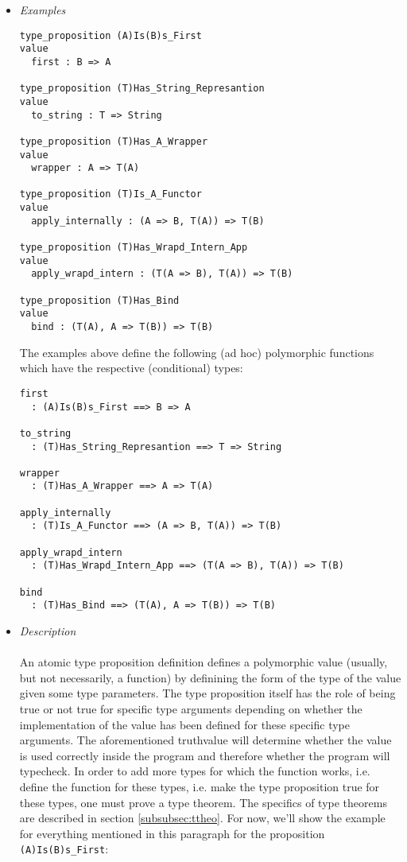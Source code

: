 \documentclass{article}
\begin{document}
\begin{itemize}
\item \textit{Examples}
\begin{verbatim}
type_proposition (A)Is(B)s_First
value
  first : B => A

type_proposition (T)Has_String_Represantion
value
  to_string : T => String

type_proposition (T)Has_A_Wrapper
value
  wrapper : A => T(A)

type_proposition (T)Is_A_Functor
value
  apply_internally : (A => B, T(A)) => T(B)

type_proposition (T)Has_Wrapd_Intern_App
value
  apply_wrapd_intern : (T(A => B), T(A)) => T(B)

type_proposition (T)Has_Bind
value
  bind : (T(A), A => T(B)) => T(B)
\end{verbatim}
The examples above define the following (ad hoc) polymorphic functions which
have the respective (conditional) types:
\begin{verbatim}
first
  : (A)Is(B)s_First ==> B => A

to_string
  : (T)Has_String_Represantion ==> T => String

wrapper
  : (T)Has_A_Wrapper ==> A => T(A)

apply_internally
  : (T)Is_A_Functor ==> (A => B, T(A)) => T(B)

apply_wrapd_intern
  : (T)Has_Wrapd_Intern_App ==> (T(A => B), T(A)) => T(B)

bind
  : (T)Has_Bind ==> (T(A), A => T(B)) => T(B)
\end{verbatim}

\item \textit{Description} \\\\
An atomic type proposition definition defines a polymorphic value (usually, but
not necessarily, a function) by definining the form of the type of the value
given some type parameters. The type proposition itself has the role of being
true or not true for specific type arguments depending on whether the
implementation of the value has been defined for these specific type
arguments. The aforementioned truthvalue will determine whether the value is
used correctly inside the program and therefore whether the program will
typecheck. In order to add more types for which the function works, i.e.
define the function for these types, i.e. make the type proposition true for
these types, one must prove a type theorem. The specifics of type theorems are
described in section \ref{subsubsec:ttheo}. For now, we'll show the example for
everything mentioned in this paragraph for the proposition
\texttt{(A)Is(B)s_First}:


\end{itemize}
\end{document}
